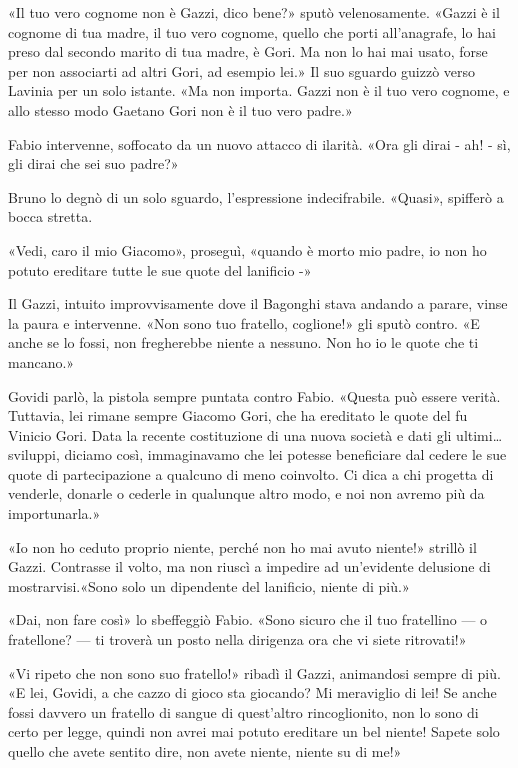 «Il tuo vero cognome non è Gazzi, dico bene?» sputò velenosamente. «Gazzi è il cognome di tua madre, il tuo vero cognome, quello che porti all'anagrafe, lo hai preso dal secondo marito di tua madre, è Gori. Ma non lo hai mai usato, forse per non associarti ad altri Gori, ad esempio lei.» Il suo sguardo guizzò verso Lavinia per un solo istante. «Ma non importa. Gazzi non è il tuo vero cognome, e allo stesso modo Gaetano Gori non è il tuo vero padre.»

Fabio intervenne, soffocato da un nuovo attacco di ilarità. «Ora gli dirai - ah! - sì, gli dirai che sei suo padre?»

Bruno lo degnò di un solo sguardo, l'espressione indecifrabile. «Quasi», spifferò a bocca stretta.

«Vedi, caro il mio Giacomo», proseguì, «quando è morto mio padre, io non ho potuto ereditare tutte le sue quote del lanificio -»

Il Gazzi, intuito improvvisamente dove il Bagonghi stava andando a parare, vinse la paura e intervenne. «Non sono tuo fratello, coglione!» gli sputò contro. «E anche se lo fossi, non fregherebbe niente a nessuno. Non ho io le quote che ti mancano.»

Govidi parlò, la pistola sempre puntata contro Fabio. «Questa può essere verità. Tuttavia, lei rimane sempre Giacomo Gori, che ha ereditato le quote del fu Vinicio Gori. Data la recente costituzione di una nuova società e dati gli ultimi\ldots sviluppi, diciamo così, immaginavamo che lei potesse beneficiare dal cedere le sue quote di partecipazione a qualcuno di meno coinvolto. Ci dica a chi progetta di venderle, donarle o cederle in qualunque altro modo, e noi non avremo più da importunarla.»

«Io non ho ceduto proprio niente, perché non ho mai avuto niente!» strillò il Gazzi. Contrasse il volto, ma non riuscì a impedire ad un'evidente delusione di mostrarvisi.«Sono solo un dipendente del lanificio, niente di più.»

«Dai, non fare così» lo sbeffeggiò Fabio. «Sono sicuro che il tuo fratellino --- o fratellone? --- ti troverà un posto nella dirigenza ora che vi siete ritrovati!»

«Vi ripeto che non sono suo fratello!» ribadì il Gazzi, animandosi sempre di più. «E lei, Govidi, a che cazzo di gioco sta giocando? Mi meraviglio di lei! Se anche fossi davvero un fratello di sangue di quest'altro rincoglionito, non lo sono di certo per legge, quindi non avrei mai potuto ereditare un bel niente! Sapete solo quello che avete sentito dire, non avete niente, niente su di me!»


